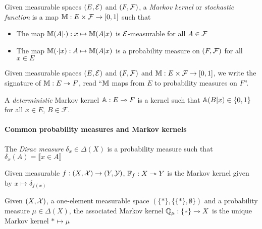 \begin{definition}\label{def:markov_kern}
Given measurable spaces $(E,\mathcal{E})$ and $(F,\mathcal{F})$, a \emph{Markov kernel} or \emph{stochastic function} is a map $\mathbb{M}:E\times\mathcal{F}\to [0,1]$ such that
\begin{itemize}
	\item The map $\mathbb{M}(A|\cdot):x\mapsto \mathbb{M}(A|x)$ is $\mathcal{E}$-measurable for all $A\in \mathcal{F}$
	\item The map $\mathbb{M}(\cdot|x):A\mapsto \mathbb{M}(A|x)$ is a probability measure on $(F,\mathcal{F})$ for all $x\in E$
\end{itemize}
\end{definition}

\begin{notation}
Given measurable spaces $(E,\mathcal{E})$ and $(F,\mathcal{F})$ and $\mathbb{M}:E\times\mathcal{F}\to [0,1]$, we write the signature of $\mathbb{M}:E\rightarrowtriangle F$, read ``$\mathbb{M}$ maps from $E$ to probability measures on $F$''.
\end{notation}

\begin{definition}
A \emph{deterministic} Markov kernel $\mathbb{A}:E\rightarrowtriangle F$ is a kernel such that $\mathbb{A}(B|x)\in\{0,1\}$ for all $x\in E$, $B\in\mathcal{F}$.
\end{definition}

\paragraph{Common probability measures and Markov kernels}

\begin{definition}\label{def:dirac_meas}
The \emph{Dirac measure} $\delta_x\in \Delta(X)$ is a probability measure such that $\delta_x(A)=\llbracket x\in A \rrbracket$
\end{definition}

\begin{definition}\label{def:mkern_func}
Given measurable $f:(X,\mathcal{X})\to (Y,\mathcal{Y})$, $\mathbb{F}_f:X\rightarrowtriangle Y$ is the Markov kernel given by $x\mapsto \delta_{f(x)}$
\end{definition}

\begin{definition}
Given $(X,\mathcal{X})$, a one-element measurable space $(\{*\},\{\{*\},\emptyset\})$ and a probability measure $\mu\in \Delta(X)$, the associated Markov kernel $\mathbb{Q}_\mu:\{*\}\rightarrowtriangle X$ is the unique Markov kernel $*\mapsto \mu$
\end{definition}

